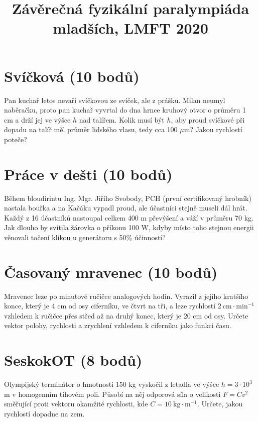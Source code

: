 \documentclass[10pt,a4paper,landscape,twocolumn]{article}
\title{Závěrečná fyzikální paralympiáda mladších, LMFT 2020}
\date{}
\author{}
\begin{document}
\maketitle
\thispagestyle{empty}


\section{Svíčková (10 bodů)}
Pan kuchař letos nevaří svíčkovou ze svíček, ale z prášku. Milan neumyl naběračku, proto pan kuchař vyvrtal do dna hrnce kruhový otvor o průměru 1 cm a drží jej ve výšce $h$ nad talířem. Kolik musí být $h$, aby proud svíčkové při dopadu na talíř měl průměr lidského vlasu, tedy cca 100 $\mu$m? Jakou rychlostí poteče?

\section{Práce v dešti (10 bodů)}
Během bloudirintu Ing. Mgr. Jiřího Svobody, PCH (první certifikovaný hrobník) nastala bouřka a na Kačáku vypadl proud, ale účastníci stejně museli dál hrát. Každý z 16 účastníků nastoupal celkem 400 m převýšení a váží v průměru 70 kg. Jak dlouho by svítila žárovka o příkonu 100 W, kdyby místo toho stejnou energii věnovali točení klikou u generátoru s 50\% účinností?

\section{Časovaný mravenec (10 bodů)}
Mravenec leze po minutové ručičce analogových hodin. Vyrazil z jejího kratšího konce, který je 4 cm od osy ciferníku, ve čtvrt na tři, a leze rychlostí $2~\mathrm{cm}\cdot\mathrm{min}^{-1}$ vzhledem k ručičce přes střed až na druhý konec, který je 20 cm od osy. Určete vektor polohy, rychlosti a zrychlení vzhledem k ciferníku jako funkci času.

\section{SeskokOT (8 bodů)}
Olympijský terminátor o hmotnosti 150 kg vyskočil z letadla ve výšce $h = 3\cdot 10^3$ m v homogenním tíhovém poli. Působí na něj odporová síla o velikosti $F = Cv^2$ směřující proti vektoru okamžité rychlosti, kde $C = 10~\mathrm{kg}\cdot\mathrm{m}^{-1}$. Určete, jakou rychlostí dopadne na zem. 
\end{document}
